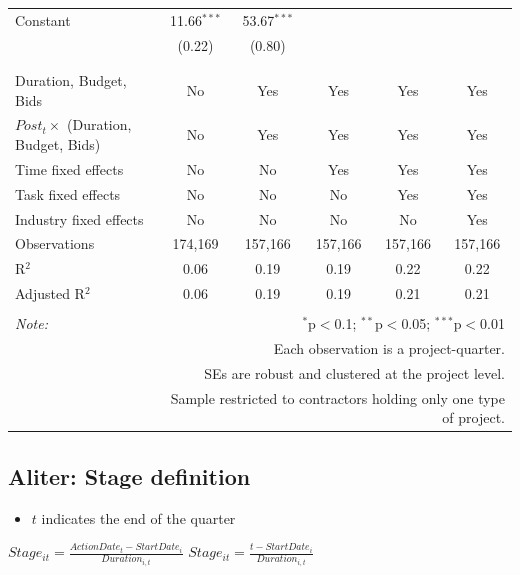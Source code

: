 \documentclass[
]{article}
\providecommand{\tightlist}{%
  \setlength{\itemsep}{0pt}\setlength{\parskip}{0pt}}
\begin{document}
\begin{table}[H]
\begin{tabular}{@{\extracolsep{-2pt}}lccccc}
 Constant & 11.66$^{***}$ & 53.67$^{***}$ &  &  &  \\ 
  & (0.22) & (0.80) &  &  &  \\ 
  & & & & & \\ 
\hline \\[-1.8ex] 
Duration, Budget, Bids & No & Yes & Yes & Yes & Yes \\ 
$Post_t \times $  (Duration, Budget, Bids) & No & Yes & Yes & Yes & Yes \\ 
Time fixed effects & No & No & Yes & Yes & Yes \\ 
Task fixed effects & No & No & No & Yes & Yes \\ 
Industry fixed effects & No & No & No & No & Yes \\ 
Observations & 174,169 & 157,166 & 157,166 & 157,166 & 157,166 \\ 
R$^{2}$ & 0.06 & 0.19 & 0.19 & 0.22 & 0.22 \\ 
Adjusted R$^{2}$ & 0.06 & 0.19 & 0.19 & 0.21 & 0.21 \\ 
\hline 
\hline \\[-1.8ex] 
\textit{Note:}  & \multicolumn{5}{r}{$^{*}$p$<$0.1; $^{**}$p$<$0.05; $^{***}$p$<$0.01} \\ 
 & \multicolumn{5}{r}{Each observation is a project-quarter.} \\ 
 & \multicolumn{5}{r}{SEs are robust and clustered at the project level.} \\ 
 & \multicolumn{5}{r}{Sample restricted to contractors holding only one type of project.} \\ 
\end{tabular} 
\end{table}

\hypertarget{aliter-stage-definition}{%
\subsection{Aliter: Stage definition}\label{aliter-stage-definition}}

\begin{itemize}
\tightlist
\item
  \(t\) indicates the end of the quarter
\end{itemize}

\(Stage_{it}=\frac{ActionDate_{t}-StartDate_i}{Duration_{i,t}}\)
\(Stage_{it}=\frac{t-StartDate_i}{Duration_{i,t}}\)
\end{document}
